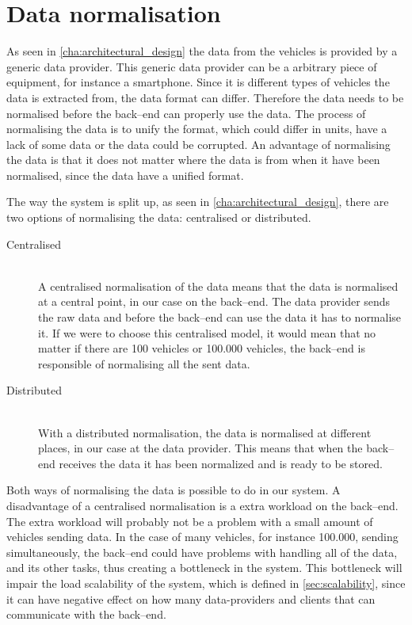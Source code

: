 \section{Data normalisation}\label{sec:data_normalisation}
As seen in \cref{cha:architectural_design} the data from the vehicles is provided by a generic data provider.
This generic data provider can be a arbitrary piece of equipment, for instance a smartphone.
Since it is different types of vehicles the data is extracted from, the data format can differ.
Therefore the data needs to be normalised before the back--end can properly use the data.
The process of normalising the data is to unify the format, which could differ in units, have a lack of some data or the data could be corrupted.
An advantage of normalising the data is that it does not matter where the data is from when it have been normalised, since the data have a unified format.

The way the system is split up, as seen in \cref{cha:architectural_design}, there are two options of normalising the data: centralised or distributed.

\begin{description}
    \item[Centralised] \hfill \\
    A centralised normalisation of the data means that the data is normalised at a central point, in our case on the back--end.
    The data provider sends the raw data and before the back--end can use the data it has to normalise it.
    If we were to choose this centralised model, it would mean that no matter if there are 100 vehicles or 100.000 vehicles,
    the back--end is responsible of normalising all the sent data.

    \item[Distributed] \hfill \\
    With a distributed normalisation, the data is normalised at different places, in our case at the data provider.
    This means that when the back--end receives the data it has been normalized and is ready to be stored.
\end{description}

\bigskip
Both ways of normalising the data is possible to do in our system.
A disadvantage of a centralised normalisation is a extra workload on the back--end.
The extra workload will probably not be a problem with a small amount of vehicles sending data.
In the case of many vehicles, for instance 100.000, sending simultaneously, the back--end could have problems with handling all of the data,
and its other tasks, thus creating a bottleneck in the system.
This bottleneck will impair the load scalability of the system, which is defined in \cref{sec:scalability},
since it can have negative effect on how many data-providers and clients that can communicate with the back--end.

